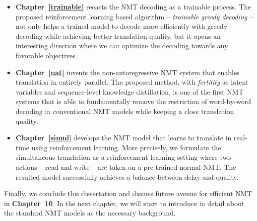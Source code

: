 \begin{itemize}
\item \textbf{Chapter~\ref{trainable}} recasts the NMT decoding as a trainable process. The proposed reinforcement learning based algorithm -- {\it trainable greedy decoding} -- not only helps a trained model to decode more efficiently with greedy decoding while achieving better translation quality, but it opens an interesting direction where we can optimize the decoding towards any favorable objectives.
\item \textbf{Chapter~\ref{nat}} invents the non-autoregressive NMT system that enables translation in entirely parallel. The proposed method, with {\it fertility} as latent variables and sequence-level knowledge distillation, is one of the first NMT systems that is able to fundamentally remove the restriction of word-by-word decoding in conventional NMT models while keeping a close translation quality.
\item \textbf{Chapter~\ref{simul}} develops the NMT model that learns to translate in real-time using reinforcement learning. More precisely, we formulate the simultaneous translation as a reinforcement learning setting where two actions -- read and write -- are taken on a pre-trained normal NMT.  The resulted model successfully achieves a balance between delay and quality. 
\end{itemize}
Finally, we conclude this dissertation and discuss future avenue for efficient NMT in \textbf{Chapter~10}.	 In the next chapter, we will start to introduce in detail about the standard NMT models as the necessary background.
